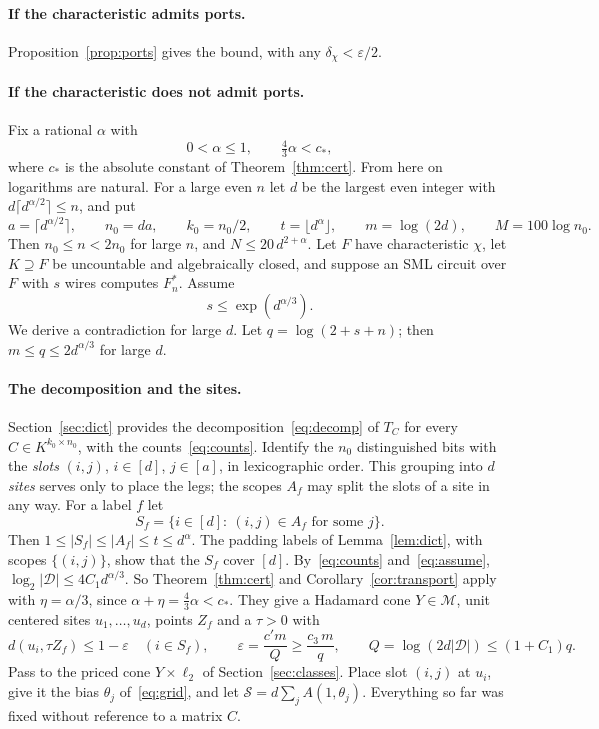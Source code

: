 \documentclass[11pt]{article}
\theoremstyle{remark}
\newcommand{\cM}{\mathcal M}
\newcommand{\cD}{\mathcal D}
\newcommand{\cS}{\mathcal S}
\begin{document}
\paragraph{If the characteristic admits ports.}
Proposition~\ref{prop:ports} gives the bound, with any
\(\delta_\chi<\varepsilon/2\).

\paragraph{If the characteristic does not admit ports.}
Fix a rational \(\alpha\) with
\[
 0<\alpha\le1,\qquad\tfrac43\alpha<c_* ,
\]
where \(c_*\) is the absolute constant of Theorem~\ref{thm:cert}. From here on
logarithms are natural. For a
large even \(n\) let \(d\) be the largest even integer with
\(d\lceil d^{\alpha/2}\rceil\le n\), and put
\[
 a=\lceil d^{\alpha/2}\rceil,\qquad n_0=da,\qquad k_0=n_0/2,\qquad
 t=\lfloor d^\alpha\rfloor,\qquad m=\log(2d),\qquad M=100\log n_0 .
\]
Then \(n_0\le n<2n_0\) for large \(n\), and \(N\le20\,d^{2+\alpha}\). Let \(F\) have characteristic \(\chi\),
let \(K\supseteq F\) be uncountable and algebraically closed, and suppose
an SML circuit over \(F\) with \(s\) wires computes \(F^*_n\). Assume
\begin{equation}\label{eq:assume}
 s\le\exp(d^{\alpha/3}).
\end{equation}
We derive a contradiction for large \(d\). Let \(q=\log(2+s+n)\); then
\(m\le q\le2d^{\alpha/3}\) for large \(d\).

\paragraph{The decomposition and the sites.}
Section~\ref{sec:dict} provides the decomposition~\eqref{eq:decomp} of
\(T_C\) for every \(C\in K^{k_0\times n_0}\), with the
counts~\eqref{eq:counts}. Identify the \(n_0\) distinguished bits with the
\emph{slots} \((i,j)\), \(i\in[d]\), \(j\in[a]\), in lexicographic order.
This grouping into \(d\) \emph{sites} serves only to place the legs; the
scopes \(A_f\) may split the slots of a site in any way. For a label
\(f\) let
\[
 S_f=\{i\in[d]:\ (i,j)\in A_f\text{ for some }j\}.
\]
Then \(1\le|S_f|\le|A_f|\le t\le d^\alpha\). The padding labels of
Lemma~\ref{lem:dict}, with scopes \(\{(i,j)\}\), show that the \(S_f\)
cover \([d]\). By~\eqref{eq:counts}
and~\eqref{eq:assume}, \(\log_2|\cD|\le4C_1d^{\alpha/3}\). So
Theorem~\ref{thm:cert} and Corollary~\ref{cor:transport} apply with
\(\eta=\alpha/3\), since \(\alpha+\eta=\tfrac43\alpha<c_*\). They give a
Hadamard cone \(Y\in\cM\), unit centered sites \(u_1,\ldots,u_d\),
points \(Z_f\) and a \(\tau>0\) with
\begin{equation}\label{eq:short}
 d(u_i,\tau Z_f)\le1-\varepsilon\quad(i\in S_f),\qquad
 \varepsilon=\frac{c'm}{Q}\ge\frac{c_3\,m}{q},\qquad
 Q=\log(2d|\cD|)\le(1+C_1)q .
\end{equation}
Pass to the priced cone \(Y\times\ell_2\) of Section~\ref{sec:classes}.
Place slot \((i,j)\) at \(u_i\), give it the bias \(\theta_j\)
of~\eqref{eq:grid}, and let \(\cS=d\sum_jA(1,\theta_j)\). Everything so
far was fixed without reference to a matrix \(C\).
\end{document}
